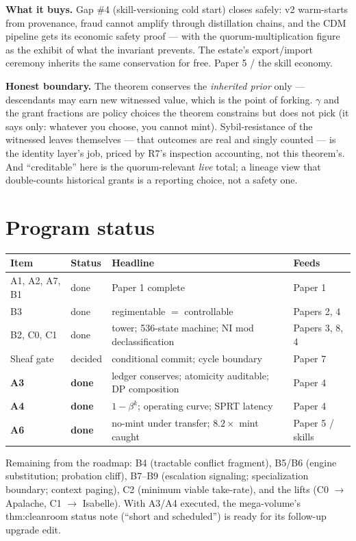 \documentclass[11pt,a4paper]{article}
\begin{document}
\textbf{What it buys.} Gap \#4 (skill-versioning cold start) closes safely: v2 warm-starts from provenance, fraud cannot amplify through distillation chains, and the CDM pipeline gets its economic safety proof --- with the quorum-multiplication figure as the exhibit of what the invariant prevents. The estate's export/import ceremony inherits the same conservation for free. Paper 5 / the skill economy.

\begin{boundary}
\textbf{Honest boundary.} The theorem conserves the \emph{inherited prior} only --- descendants may earn new witnessed value, which is the point of forking. $\gamma$ and the grant fractions are policy choices the theorem constrains but does not pick (it says only: whatever you choose, you cannot mint). Sybil-resistance of the witnessed leaves themselves --- that outcomes are real and singly counted --- is the identity layer's job, priced by R7's inspection accounting, not this theorem's. And ``creditable'' here is the quorum-relevant \emph{live} total; a lineage view that double-counts historical grants is a reporting choice, not a safety one.
\end{boundary}

\section{Program status}
\begin{center}
\begin{tabular}{@{}llll@{}}
\toprule
Item & Status & Headline & Feeds \\
\midrule
A1, A2, A7, B1 & done & Paper 1 complete & Paper 1 \\
B3 & done & regimentable $=$ controllable & Papers 2, 4 \\
B2, C0, C1 & done & tower; 536-state machine; NI mod declassification & Papers 3, 8, 4 \\
Sheaf gate & decided & conditional commit; cycle boundary & Paper 7 \\
\textbf{A3} & \textbf{done} & ledger conserves; atomicity auditable; DP composition & Paper 4 \\
\textbf{A4} & \textbf{done} & $1-\beta^k$; operating curve; SPRT latency & Paper 4 \\
\textbf{A6} & \textbf{done} & no-mint under transfer; $8.2\times$ mint caught & Paper 5 / skills \\
\bottomrule
\end{tabular}
\end{center}
Remaining from the roadmap: B4 (tractable conflict fragment), B5/B6 (engine substitution; probation cliff), B7--B9 (escalation signaling; specialization boundary; context paging), C2 (minimum viable take-rate), and the lifts (C0 $\to$ Apalache, C1 $\to$ Isabelle). With A3/A4 executed, the mega-volume's thm:cleanroom status note (``short and scheduled'') is ready for its follow-up upgrade edit.
\end{document}

